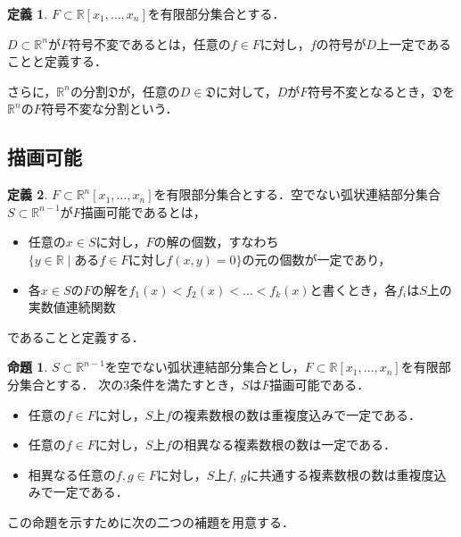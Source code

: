 \documentclass[uplatex, dvipdfmx]{jsarticle}
\newcommand{\R}{\mathbb{R}}
\theoremstyle{definition}
\newtheorem{definition}{定義}[section]
\newtheorem{proposition}{命題}[section]
\begin{document}
\begin{definition}
$F \subset \R[x_1, \dots, x_n]$を有限部分集合とする．

$D \subset \R^n$が$F$符号不変であるとは，任意の$f \in F$に対し，$f$の符号が$D$上一定であることと定義する．

さらに，$\R^n$の分割$\mathfrak{D}$が，任意の$D \in \mathfrak{D}$に対して，$D$が$F$符号不変となるとき，$\mathfrak{D}$を$\R^n$の$F$符号不変な分割という．
\end{definition}

\subsection{描画可能}
\begin{definition}
$F \subset \R^n[x_1, \dots, x_n]$を有限部分集合とする．空でない弧状連結部分集合$S \subset \R^{n-1}$が$F$描画可能であるとは，
\begin{itemize}
	\item 任意の$ x \in S $に対し，$ F $の解の個数，すなわち$ \{y \in \mathbb{R} \mid \text{ある$f \in F$に対し$f(x,y) = 0$} \} $の元の個数が一定であり，
	\item 各$ x \in S $の$F$の解を$ f_1(x) < f_2(x) < \dots < f_k(x) $と書くとき，各$ f_i $は$ S $上の実数値連続関数
\end{itemize}
であることと定義する．
\end{definition}

\begin{proposition}\label{proposition:del}
$S \subset \R^{n-1}$を空でない弧状連結部分集合とし，$F \subset \R[x_1, \dots, x_n]$を有限部分集合とする．
次の3条件を満たすとき，$S$は$F$描画可能である．
\begin{itemize}
     \item 任意の$f \in F$に対し，$S$上$f$の複素数根の数は重複度込みで一定である．
     \item 任意の$f \in F$に対し，$S$上$f$の相異なる複素数根の数は一定である．
     \item 相異なる任意の$f, g \in F$に対し，$S$上$f$, $g$に共通する複素数根の数は重複度込みで一定である．
\end{itemize}
\end{proposition}

この命題を示すために次の二つの補題を用意する．
\end{document}
